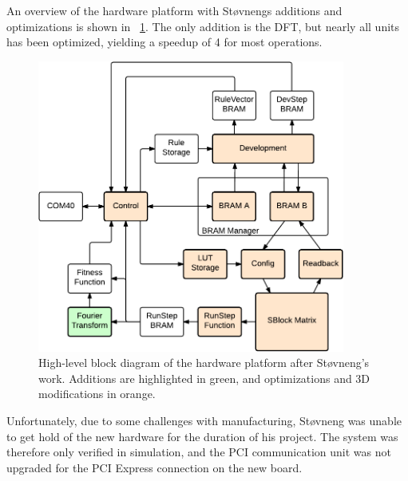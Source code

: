 An overview of the hardware platform with Støvnengs additions and optimizations is shown in \figurename~\ref{fig:overview-stovneng}.
The only addition is the DFT, but nearly all units has been optimized, yielding a speedup of 4 for most operations.

\begin{figure}[!ht]
    \centering
    \includegraphics[width=0.9\textwidth]{figures/overview-stovneng}
    \caption[Støvneng's hardware design.]{
        High-level block diagram of the hardware platform after Støvneng's work.
        Additions are highlighted in green, and optimizations and 3D modifications in orange.
    }
    \label{fig:overview-stovneng}
\end{figure}

Unfortunately, due to some challenges with manufacturing, Støvneng was unable to get hold of the new hardware for the duration of his project.
The system was therefore only verified in simulation, and the PCI communication unit was not upgraded for the PCI Express connection on the new board.
